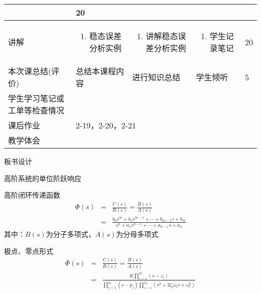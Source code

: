 {\begin{landscape}
\begin{longtable}{|m{10mm}|m{50mm}|m{50mm}|m{50mm}|m{15mm}|}
\begin{enumerate}
\end{enumerate} &20 \\\hline
讲解&\begin{enumerate}
\item 稳态误差分析实例
\end{enumerate}
 &\begin{enumerate}
\item 讲解稳态误差分析实例
\end{enumerate} &\begin{enumerate}
\item 学生记录笔记
\end{enumerate} &20 \\\hline

\centering 本次课总结(评价)&总结本课程内容 &进行知识总结 &学生倾听 &5 \\\hline
\centering 学生学习笔记或工单等检查情况&\multicolumn{4}{m{165mm}|}{\quad}\\\hline
\centering 课后作业&\multicolumn{4}{m{165mm}|}{2-19，2-20，2-21}\\\hline
\centering 教学体会&\multicolumn{4}{m{165mm}|}{\quad}\\
\end{longtable}

\end{landscape}
\clearpage
\begin{center}
{\huge 板书设计}
\end{center}
}
 \begin{frame}{高阶系统的单位阶跃响应}
 \begin{block}{高阶闭环传递函数}
 \begin{eqnarray*}
 \Phi(s)&=&\frac{C(s)}{R(s)}=\frac{B(s)}{A(s)}\\
 &=&\frac{b_0s^m+b_1s^{m-1}+\cdots +b_{m-1}s+b_m}{s^n+a_1s^{n-1}+\cdots +a_{n-1}s+a_n}
 \end{eqnarray*}
 其中：$B(s)$为分子多项式，$A(s)$为分母多项式
 \end{block}
 \end{frame}
 
 \begin{frame}
 \begin{block}{极点、零点形式}
 \begin{eqnarray*}
 \Phi(s)&=&\frac{C(s)}{R(s)}=\frac{B(s)}{A(s)}\\
&=&\frac{K\prod_{i=1}^m(s-z_i)}{\prod_{j=1}^{n_1}(s-p_j)\prod_{i=1}^{n_2}(s^2+2\zeta_l\omega_ls+\omega_l^2)}
\end{eqnarray*}  
\end{block}
\end{frame}

